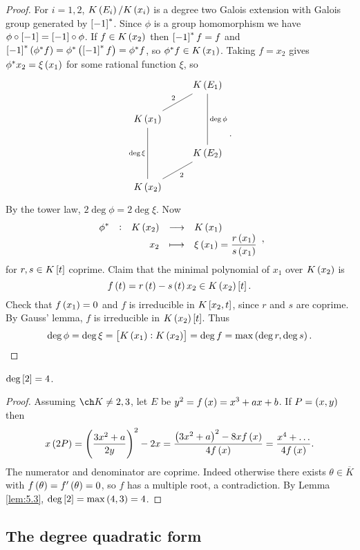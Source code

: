 \pagebreak

\begin{proof}
For $ i = 1, 2 $, $ K\br{E_i} / K\br{x_i} $ is a degree two Galois extension with Galois group generated by $ \sbr{-1}^* $. Since $ \phi $ is a group homomorphism we have $ \phi \circ \sbr{-1} = \sbr{-1} \circ \phi $. If $ f \in K\br{x_2} $ then $ \sbr{-1}^*f = f $ and $ \sbr{-1}^*\br{\phi^*f} = \phi^*\br{\sbr{-1}^*f} = \phi^*f $, so $ \phi^*f \in K\br{x_1} $. Taking $ f = x_2 $ gives $ \phi^*x_2 = \xi\br{x_1} $ for some rational function $ \xi $, so
$$
\begin{tikzcd}
& K\br{E_1} \arrow[dash]{dl}[swap]{2} \arrow[dash]{dd}{\deg \phi} \\
K\br{x_1} \arrow[dash]{dd}[swap]{\deg \xi} & \\
& K\br{E_2} \arrow[dash]{dl}{2} \\
K\br{x_2} &
\end{tikzcd}.
$$
By the tower law, $ 2\deg \phi = 2\deg \xi $. Now
$$ \function[\phi^*]{K\br{x_2}}{K\br{x_1}}{x_2}{\xi\br{x_1} = \dfrac{r\br{x_1}}{s\br{x_1}}}, $$
for $ r, s \in K\sbr{t} $ coprime. Claim that the minimal polynomial of $ x_1 $ over $ K\br{x_2} $ is
$$ f\br{t} = r\br{t} - s\br{t}x_2 \in K\br{x_2}\sbr{t}. $$
Check that $ f\br{x_1} = 0 $ and $ f $ is irreducible in $ K\sbr{x_2, t} $, since $ r $ and $ s $ are coprime. By Gauss' lemma, $ f $ is irreducible in $ K\br{x_2}\sbr{t} $. Thus
$$ \deg \phi = \deg \xi = \sbr{K\br{x_1} : K\br{x_2}} = \deg f = \max\br{\deg r, \deg s}. $$
\end{proof}

\begin{lemma}
$ \deg \sbr{2} = 4 $.
\end{lemma}

\begin{proof}
Assuming $ \ch K \ne 2, 3 $, let $ E $ be $ y^2 = f\br{x} = x^3 + ax + b $. If $ P = \br{x, y} $ then
$$ x\br{2P} = \br{\dfrac{3x^2 + a}{2y}}^2 - 2x = \dfrac{\br{3x^2 + a}^2 - 8xf\br{x}}{4f\br{x}} = \dfrac{x^4 + \dots}{4f\br{x}}. $$
The numerator and denominator are coprime. Indeed otherwise there exists $ \theta \in \overline{K} $ with $ f\br{\theta} = f'\br{\theta} = 0 $, so $ f $ has a multiple root, a contradiction. By Lemma \ref{lem:5.3}, $ \deg \sbr{2} = \max\br{4, 3} = 4 $.
\end{proof}

\subsection{The degree quadratic form}

